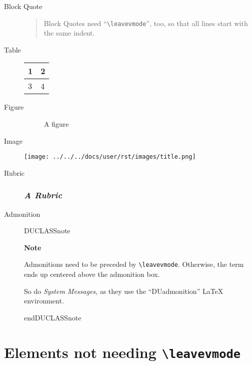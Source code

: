 \documentclass[a4paper]{article}
\newlength{\DUtablewidth} %
\newenvironment{DUclass}[1]%
    {%
     \def\DocutilsClassFunctionName{DUCLASS#1}
     \csname \DocutilsClassFunctionName \endcsname}%
    {\csname end\DocutilsClassFunctionName \endcsname}%
\newenvironment{DUadmonition}%
    {\begin{center}
       \begin{lrbox}{\DUadmonitionbox}
         \begin{minipage}{0.9\linewidth}
    }%
    {    \end{minipage}
       \end{lrbox}
       \fbox{\usebox{\DUadmonitionbox}}
     \end{center}
    }
\providecommand*{\DUrubric}[1]{\subsubsection*{\emph{#1}}}
\providecommand*{\DUtitle}[1]{%
  \smallskip\noindent\textbf{#1}\smallskip}
\begin{document}
\begin{description}
\item[{Block Quote}] \leavevmode
% 

\begin{quote}
Block Quotes need “\texttt{\textbackslash{}leavevmode}”, too,
so that all lines start with the same indent.
\end{quote}

\item[{Table}] \leavevmode
\setlength{\DUtablewidth}{\linewidth}%
\begin{longtable*}{|p{0.051\DUtablewidth}|p{0.051\DUtablewidth}|}
\hline

1
 & 
2
 \\
\hline

3
 & 
4
 \\
\hline
\end{longtable*}

\item[{Figure}] \leavevmode
\begin{figure}
\noindent{}
\caption{A figure}
\end{figure}

\item[{Image}] \leavevmode

\texttt{[image: ../../../docs/user/rst/images/title.png]}

\item[{Rubric}] \leavevmode
\DUrubric{A Rubric}

\item[{Admonition}] \leavevmode
\begin{DUclass}{note}
\begin{DUadmonition}
\DUtitle{Note}

Admonitions need to be preceded by \texttt{\textbackslash{}leavevmode}.
Otherwise, the term ends up centered above the admonition box.

So do \emph{System Messages}, as they use the “DUadmonition”
LaTeX environment.
\end{DUadmonition}
\end{DUclass}
\end{description}


\section{Elements not needing \texttt{\textbackslash{}leavevmode}%
  \label{elements-not-needing-leavevmode}%
}
\end{document}
